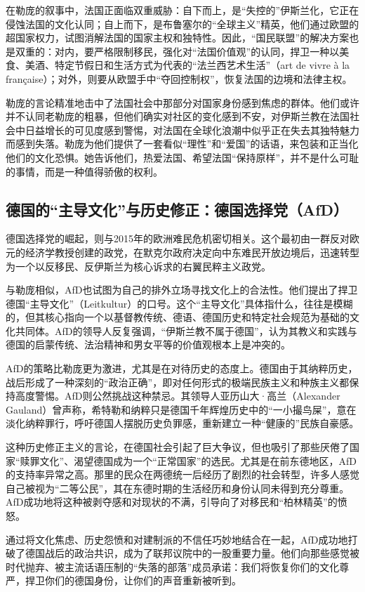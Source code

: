 在勒庞的叙事中，法国正面临双重威胁：自下而上，是“失控的”伊斯兰化，它正在侵蚀法国的文化认同；自上而下，是布鲁塞尔的“全球主义”精英，他们通过欧盟的超国家权力，试图消解法国的国家主权和独特性。因此，“国民联盟”的解决方案也是双重的：对内，要严格限制移民，强化对“法国价值观”的认同，捍卫一种以美食、美酒、特定节假日和生活方式为代表的“法兰西艺术生活”（art de vivre à la française）；对外，则要从欧盟手中“夺回控制权”，恢复法国的边境和法律主权。

勒庞的言论精准地击中了法国社会中那部分对国家身份感到焦虑的群体。他们或许并不认同老勒庞的粗暴，但他们确实对社区的变化感到不安，对伊斯兰教在法国社会中日益增长的可见度感到警惕，对法国在全球化浪潮中似乎正在失去其独特魅力而感到失落。勒庞为他们提供了一套看似“理性”和“爱国”的话语，来包装和正当化他们的文化恐惧。她告诉他们，热爱法国、希望法国“保持原样”，并不是什么可耻的事情，而是一种值得骄傲的权利。

\subsection{德国的“主导文化”与历史修正：德国选择党（AfD）}

德国选择党的崛起，则与2015年的欧洲难民危机密切相关。这个最初由一群反对欧元的经济学教授创建的政党，在默克尔政府决定向中东难民开放边境后，迅速转型为一个以反移民、反伊斯兰为核心诉求的右翼民粹主义政党。

与勒庞相似，AfD也试图为自己的排外立场寻找文化上的合法性。他们提出了捍卫德国“主导文化”（Leitkultur）的口号。这个“主导文化”具体指什么，往往是模糊的，但其核心指向一个以基督教传统、德语、德国历史和特定社会规范为基础的文化共同体。AfD的领导人反复强调，“伊斯兰教不属于德国”，认为其教义和实践与德国的启蒙传统、法治精神和男女平等的价值观根本上是冲突的。

AfD的策略比勒庞更为激进，尤其是在对待历史的态度上。德国由于其纳粹历史，战后形成了一种深刻的“政治正确”，即对任何形式的极端民族主义和种族主义都保持高度警惕。AfD则公然挑战这种禁忌。其领导人亚历山大·高兰（Alexander Gauland）曾声称，希特勒和纳粹只是德国千年辉煌历史中的“一小撮鸟屎”，意在淡化纳粹罪行，呼吁德国人摆脱历史负罪感，重新建立一种“健康的”民族自豪感。

这种历史修正主义的言论，在德国社会引起了巨大争议，但也吸引了那些厌倦了国家“赎罪文化”、渴望德国成为一个“正常国家”的选民。尤其是在前东德地区，AfD的支持率异常之高。那里的民众在两德统一后经历了剧烈的社会转型，许多人感觉自己被视为“二等公民”，其在东德时期的生活经历和身份认同未得到充分尊重。AfD成功地将这种被剥夺感和对现状的不满，引导向了对移民和“柏林精英”的愤怒。

通过将文化焦虑、历史怨愤和对建制派的不信任巧妙地结合在一起，AfD成功地打破了德国战后的政治共识，成为了联邦议院中的一股重要力量。他们向那些感觉被时代抛弃、被主流话语压制的“失落的部落”成员承诺：我们将恢复你们的文化尊严，捍卫你们的德国身份，让你们的声音重新被听到。

